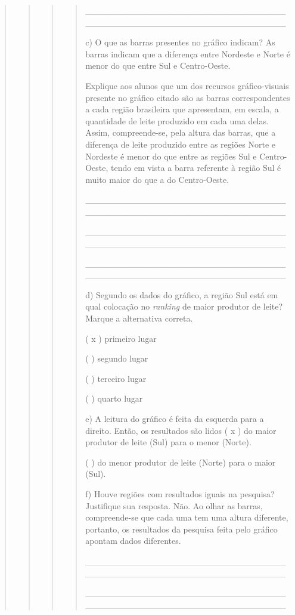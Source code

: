 \begin{quote}
\begin{quote}
\begin{quote}
\begin{quote}
\_\_\_\_\_\_\_\_\_\_\_\_\_\_\_\_\_\_\_\_\_\_\_\_\_\_\_\_\_\_\_\_\_\_\_\_\_\_\_\_\_\_\_\_\_\_\_\_\_\_\_\_\_\_\_\_\_\_\_\_\_\_\_\_

c) O que as barras presentes no gráfico indicam? As barras indicam que a
diferença entre Nordeste e Norte é menor do que entre Sul e
Centro-Oeste.

Explique aos alunos que um dos recursos gráfico-visuais presente no
gráfico citado são as barras correspondentes a cada região brasileira
que apresentam, em escala, a quantidade de leite produzido em cada uma
delas. Assim, compreende-se, pela altura das barras, que a diferença de
leite produzido entre as regiões Norte e Nordeste é menor do que entre
as regiões Sul e Centro-Oeste, tendo em vista a barra referente à região
Sul é muito maior do que a do Centro-Oeste.

\_\_\_\_\_\_\_\_\_\_\_\_\_\_\_\_\_\_\_\_\_\_\_\_\_\_\_\_\_\_\_\_\_\_\_\_\_\_\_\_\_\_\_\_\_\_\_\_\_\_\_\_\_\_\_\_\_\_\_\_\_\_\_\_

\_\_\_\_\_\_\_\_\_\_\_\_\_\_\_\_\_\_\_\_\_\_\_\_\_\_\_\_\_\_\_\_\_\_\_\_\_\_\_\_\_\_\_\_\_\_\_\_\_\_\_\_\_\_\_\_\_\_\_\_\_\_\_\_

\_\_\_\_\_\_\_\_\_\_\_\_\_\_\_\_\_\_\_\_\_\_\_\_\_\_\_\_\_\_\_\_\_\_\_\_\_\_\_\_\_\_\_\_\_\_\_\_\_\_\_\_\_\_\_\_\_\_\_\_\_\_\_\_

d) Segundo os dados do gráfico, a região Sul está em qual colocação no
\emph{ranking} de maior produtor de leite? Marque a alternativa correta.

( x ) primeiro lugar

( ) segundo lugar

( ) terceiro lugar

( ) quarto lugar

e) A leitura do gráfico é feita da esquerda para a direito. Então, os
resultados são lidos ( x ) do maior produtor de leite (Sul) para o menor
(Norte).

( ) do menor produtor de leite (Norte) para o maior (Sul).

f) Houve regiões com resultados iguais na pesquisa? Justifique sua
resposta. Não. Ao olhar as barras, compreende-se que cada uma tem uma
altura diferente, portanto, os resultados da pesquisa feita pelo gráfico
apontam dados diferentes.

\_\_\_\_\_\_\_\_\_\_\_\_\_\_\_\_\_\_\_\_\_\_\_\_\_\_\_\_\_\_\_\_\_\_\_\_\_\_\_\_\_\_\_\_\_\_\_\_\_\_\_\_\_\_\_\_\_\_\_\_\_\_\_\_

\_\_\_\_\_\_\_\_\_\_\_\_\_\_\_\_\_\_\_\_\_\_\_\_\_\_\_\_\_\_\_\_\_\_\_\_\_\_\_\_\_\_\_\_\_\_\_\_\_\_\_\_\_\_\_\_\_\_\_\_\_\_\_\_


\end{quote}
\end{quote}
\end{quote}
\end{quote}
